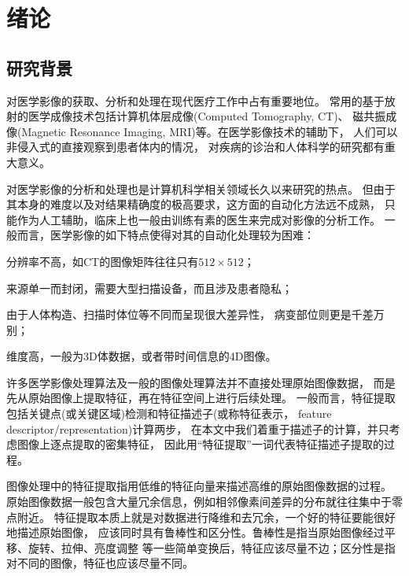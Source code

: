 
\chapter{绪论\label{chap:intro}}

\section{研究背景}
对医学影像的获取、分析和处理在现代医疗工作中占有重要地位。
常用的基于放射的医学成像技术包括计算机体层成像(Computed Tomography, CT)、
磁共振成像(Magnetic Resonance Imaging, MRI)等。在医学影像技术的辅助下，
人们可以非侵入式的直接观察到患者体内的情况，
对疾病的诊治和人体科学的研究都有重大意义。

对医学影像的分析和处理也是计算机科学相关领域长久以来研究的热点。
但由于其本身的难度以及对结果精确度的极高要求，这方面的自动化方法远不成熟，
只能作为人工辅助，临床上也一般由训练有素的医生来完成对影像的分析工作。
一般而言，医学影像的如下特点使得对其的自动化处理较为困难：
\begin{inparaenum}[\itshape 1\upshape)]
    \item 分辨率不高，如CT的图像矩阵往往只有$512\times 512$\cite{medimging2}；
    \item 来源单一而封闭，需要大型扫描设备，而且涉及患者隐私；
    \item 由于人体构造、扫描时体位等不同而呈现很大差异性，
        病变部位则更是千差万别；
    \item 维度高，一般为3D体数据，或者带时间信息的4D图像。
\end{inparaenum}

许多医学影像处理算法及一般的图像处理算法并不直接处理原始图像数据，
而是先从原始图像上提取特征，再在特征空间上进行后续处理。
一般而言，特征提取包括关键点(或关键区域)检测和特征描述子(或称特征表示，
feature descriptor/representation)计算两步，
在本文中我们着重于描述子的计算，并只考虑图像上逐点提取的密集特征，
因此用``特征提取''一词代表特征描述子提取的过程。

图像处理中的特征提取指用低维的特征向量来描述高维的原始图像数据的过程。
原始图像数据一般包含大量冗余信息，例如相邻像素间差异的分布就往往集中于零点附近。
特征提取本质上就是对数据进行降维和去冗余，一个好的特征要能很好地描述原始图像，
应该同时具有鲁棒性和区分性。鲁棒性是指当原始图像经过平移、旋转、拉伸、亮度调整
等一些简单变换后，特征应该尽量不边；区分性是指对不同的图像，特征也应该尽量不同。

